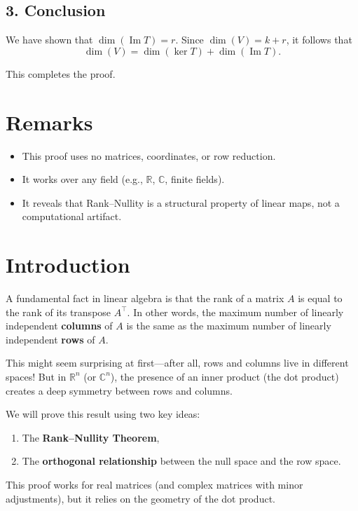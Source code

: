 \documentclass[11pt]{article}
\begin{document}
\subsection*{3. Conclusion}

We have shown that $ \dim(\operatorname{Im} T) = r $. Since $ \dim(V) = k + r $, it follows that
\[
\dim(V) = \dim(\ker T) + \dim(\operatorname{Im} T).
\]

This completes the proof.

\section*{Remarks}

\begin{itemize}
\item This proof uses no matrices, coordinates, or row reduction.
    \item It works over any field (e.g., $ \mathbb{R} $, $ \mathbb{C} $, finite fields).
    \item It reveals that Rank--Nullity is a structural property of linear maps, not a computational artifact.
\end{itemize}



\section*{Introduction}

A fundamental fact in linear algebra is that the rank of a matrix $ A $ is equal to the rank of its transpose $ A^\top $.  
In other words, the maximum number of linearly independent \textbf{columns} of $ A $ is the same as the maximum number of linearly independent \textbf{rows} of $ A $.

This might seem surprising at first—after all, rows and columns live in different spaces!  
But in $ \mathbb{R}^n $ (or $ \mathbb{C}^n $), the presence of an inner product (the dot product) creates a deep symmetry between rows and columns.

We will prove this result using two key ideas:
\begin{enumerate}
    \item The \textbf{Rank--Nullity Theorem},
    \item The \textbf{orthogonal relationship} between the null space and the row space.
\end{enumerate}

This proof works for real matrices (and complex matrices with minor adjustments), but it relies on the geometry of the dot product.
\end{document}
